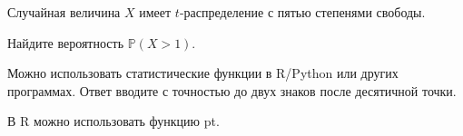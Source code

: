 
\begin{question}
Случайная величина \(X\) имеет \(t\)-распределение с пятью степенями свободы.

Найдите вероятность \(\mathbb{P}(X > 1)\).

Можно использовать статистические функции в R/Python или других программах.
Ответ вводите с точностью до двух знаков после десятичной точки.
\end{question}

\begin{solution}
В R можно использовать функцию pt.
\end{solution}

